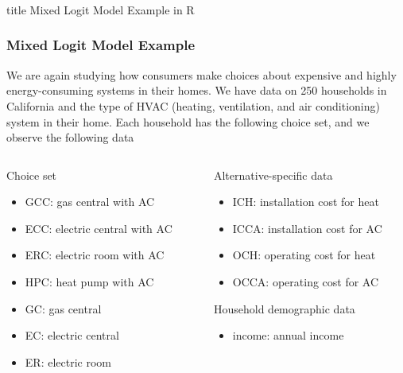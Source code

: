 \documentclass{beamer}
\begin{document}
\begin{frame}\frametitle{}
    \vfill
    \centering
    \begin{beamercolorbox}[center]{title}
        \Large Mixed Logit Model Example in R
    \end{beamercolorbox}
    \vfill
\end{frame}

\begin{frame}\frametitle{Mixed Logit Model Example}
    We are again studying how consumers make choices about expensive and highly energy-consuming systems in their homes. We have data on 250 households in California and the type of HVAC (heating, ventilation, and air conditioning) system in their home. Each household has the following choice set, and we observe the following data \\
    \vspace{3ex}
    \begin{columns}
    	\begin{column}{0.5\textwidth}
		    Choice set
		    \begin{itemize}
		    	\item GCC: gas central with AC
		    	\item ECC: electric central with AC
		    	\item ERC: electric room with AC
		    	\item HPC: heat pump with AC
		    	\item GC: gas central
		    	\item EC: electric central
		    	\item ER: electric room
		    \end{itemize}
		    \vspace{2ex}
	    \end{column}
	    \begin{column}{0.5\textwidth}
		    Alternative-specific data
		    \begin{itemize}
		    	\item ICH: installation cost for heat
		    	\item ICCA: installation cost for AC
		    	\item OCH: operating cost for heat
		    	\item OCCA: operating cost for AC
		    \end{itemize}
		    \vspace{2ex}
		    Household demographic data
		    \begin{itemize}
		    	\item income: annual income
		    \end{itemize}
		\end{column}
    \end{columns}
\end{frame}
\end{document}
